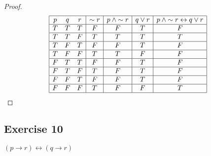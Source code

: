 \documentclass[14pt]{extarticle}
\newcommand{\bic}{\leftrightarrow}
\begin{document}
\begin{proof}
    $$
        \begin{array}{|ccc|c|c|c|c|}
            \hline
            p & q & r & {\sim r} & p \wedge {\sim r} & q \vee r & p \wedge {\sim r} \bic q \vee r \\
            \hline
            T & T & T & F        & F                 & T        & F                               \\
            \hline
            T & T & F & T        & T                 & T        & T                               \\
            \hline
            T & F & T & F        & F                 & T        & F                               \\
            \hline
            T & F & F & T        & T                 & F        & F                               \\
            \hline
            F & T & T & F        & F                 & T        & F                               \\
            \hline
            F & T & F & T        & F                 & T        & F                               \\
            \hline
            F & F & T & F        & F                 & T        & F                               \\
            \hline
            F & F & F & T        & F                 & F        & T                               \\
            \hline
        \end{array}
    $$
\end{proof}

\subsection{Exercise 10}
$(p \to r) \bic (q \to r)$
\end{document}
